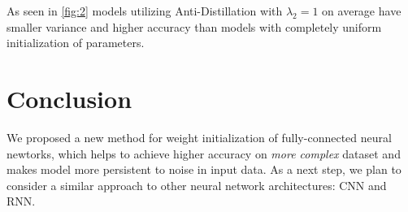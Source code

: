\documentclass[80pt]{article}
\begin{document}
As seen in \ref{fig:2} models utilizing Anti-Distillation with $\lambda_2 = 1$ on average have smaller variance and higher accuracy than models with completely uniform initialization of parameters.

\section{Conclusion}

We proposed a new method for weight initialization of fully-connected neural newtorks, which helps to achieve higher accuracy on \textit{more complex} dataset and makes model more persistent to noise in input data. As a next step, we plan to consider a similar approach to other neural network architectures: CNN and RNN.



\end{document}
